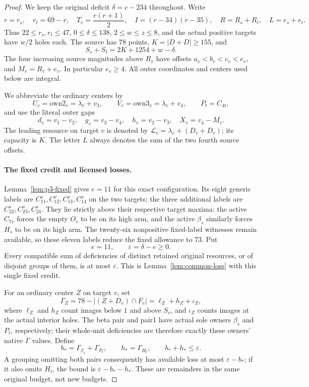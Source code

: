 \documentclass[11pt,letterpaper]{article}
\theoremstyle{definition}\newtheorem{definition}[theorem]{Definition}
\begin{document}
\begin{proof}
We keep the original deficit $\delta=c-234$ throughout. Write
\[
 r=r_s,\quad r_t=69-r,\quad T_r=\frac{r(r+1)}2,\quad
 I=(r-34)(r-35),\quad R=R_s+R_t,\quad L=e_s+e_t.
\]
Thus $22\le r_s,r_t\le47$, $0\le\delta\le138$, $2\le w\le z\le8$,
and the actual positive targets have $w/2$ holes each. The source has
$78$ points, $K=|D+D|\ge155$, and
\begin{equation}\label{eq:p3-a1-mass}
 S_s+S_t=2K+1254+w-\delta.
\end{equation}
The four increasing source magnitudes above $R_v$ have offsets
$a_v<b_v<c_v<e_v$, and $M_v=R_v+e_v$. In particular $e_v\ge4$.
All outer coordinates and centers used below are integral.

We abbreviate the ordinary centers by
\[
 U_v=\mathrm{own2}_v=\lambda_v+v_3,\qquad
 V_v=\mathrm{own3}_v=\lambda_v+v_4,\qquad P_t=C_{4t},
\]
and use the literal outer gaps
\[
 d_v=v_1-v_2,\quad g_v=v_3-v_4,\quad h_v=v_2-v_3,
 \quad X_v=v_4-M_v.
\]
The leading resource on target $v$ is denoted by
$\mathcal L_v=\lambda_v+(D_v+D_v)$; its capacity is $K$.
The letter $L$ always denotes the sum of the two fourth source offsets.

\paragraph{The fixed credit and licensed losses.}
Lemma~\ref{lem:p3-fixed} gives $e=11$ for this exact configuration.
Its eight generic labels are $C^v_{11},C^v_{12},C^v_{13},C^v_{14}$
on the two targets; the three additional labels are
$C^s_{22},C^s_{23},C^s_{24}$. They lie strictly above their respective
target maxima: the active $C_{7v}$ forces the empty $O_v$ to be on its
high arm, and the active $\beta_s$ similarly forces $H_s$ to be on
its high arm. The twenty-six nonpositive fixed-label witnesses remain
available, so these eleven labels reduce the fixed allowance to $73$.
Put
\begin{equation}\label{eq:p3-a1-budget}
 e=11,\qquad \varepsilon=\delta-e\ge0.
\end{equation}
Every compatible sum of deficiencies of distinct retained original
resources, or of disjoint groups of them, is at most $\varepsilon$.
This is Lemma~\ref{lem:common-loss} with this single fixed credit.

For an ordinary center $Z$ on target $v$, set
\[
 \Gamma_Z=78-| (Z+D_v)\cap F_v |
          =\ell_Z+h_Z+\iota_Z,
\]
where $\ell_Z$ and $h_Z$ count images below $1$ and above $S_v$, and
$\iota_Z$ counts images at the actual interior holes. The beta pair and
pair1 have actual sole owners $\beta_s$ and $P_t$, respectively; their
whole-unit deficiencies are therefore exactly these owners' native
$\Gamma$ values. Define
\begin{equation}\label{eq:p3-a1-reserved-losses}
 b_*=\Gamma_{\beta_s}+\Gamma_{P_t},\qquad
 h_*=\Gamma_{H_t},\qquad
 b_*+h_*\le\varepsilon.
\end{equation}
A grouping omitting both pairs consequently has available loss at most
$\varepsilon-b_*$; if it also omits $H_t$, the bound is
$\varepsilon-b_*-h_*$. These are remainders in the
same original budget, not new budgets.


\end{proof}
\end{document}
